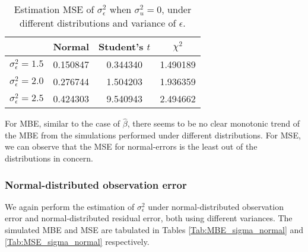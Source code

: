 \documentclass{article}
\begin{document}
\begin{table}[ht]
    \centering
    \caption{Estimation MSE of $\sigma^2_\epsilon$ when $\sigma^2_u=0$, under different distributions and variance of $\epsilon$.}
    \label{Tab:MSE_sigma_absence}
    \begin{tabular}[t]{lccc}
        \hline
        &Normal&Student's $t$&$\chi^2$\\
        \hline
        $\sigma^2_\epsilon = 1.5$&0.150847&0.344340&1.490189\\
        $\sigma^2_\epsilon = 2.0$&0.276744&1.504203&1.936359\\
        $\sigma^2_\epsilon = 2.5$&0.424303&9.540943&2.494662\\
        \hline
    \end{tabular}
\end{table}

For MBE, similar to the case of $\hat{\beta}$, there seems to be no clear monotonic trend of the MBE from the simulations performed under different distributions. 
For MSE, we can observe that the MSE for normal-errors is the least out of the distributions in concern.

\subsubsection{Normal-distributed observation error}

We again perform the estimation of $\sigma^2_\epsilon$ under normal-distributed observation error and normal-distributed residual error, both using different variances.
The simulated MBE and MSE are tabulated in Tables \ref{Tab:MBE_sigma_normal} and \ref{Tab:MSE_sigma_normal} respectively.
\end{document}
